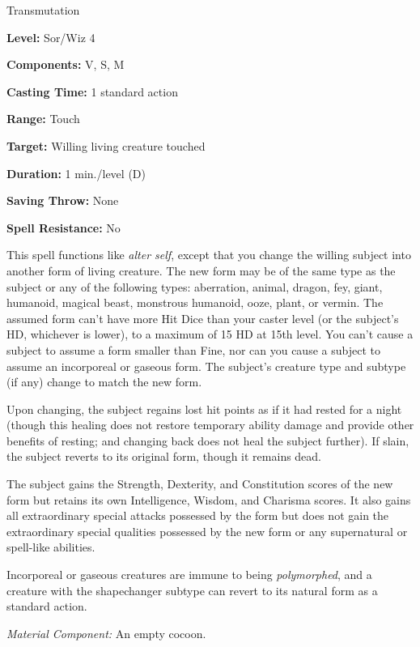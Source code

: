 
Transmutation

\textbf{Level:} Sor/Wiz 4

\textbf{Components:} V, S, M

\textbf{Casting Time:} 1 standard action

\textbf{Range:} Touch

\textbf{Target:} Willing living creature touched

\textbf{Duration:} 1 min./level (D)

\textbf{Saving Throw:} None

\textbf{Spell Resistance:} No

This spell functions like \textit{alter self}, except that you change the willing 
subject into another form of living creature. The new form may be of the same type 
as the subject or any of the following types: aberration, animal, dragon, fey, 
giant, humanoid, magical beast, monstrous humanoid, ooze, plant, or vermin. The 
assumed form can't have more Hit Dice than your caster level (or the subject's 
HD, whichever is lower), to a maximum of 15 HD at 15th level. You can't cause a 
subject to assume a form smaller than Fine, nor can you cause a subject to assume 
an incorporeal or gaseous form. The subject's creature type and subtype (if any) 
change to match the new form.

Upon changing, the subject regains lost hit points as if it had rested for a night 
(though this healing does not restore temporary ability damage and provide other 
benefits of resting; and changing back does not heal the subject further). If slain, 
the subject reverts to its original form, though it remains dead.

The subject gains the Strength, Dexterity, and Constitution scores of the new form 
but retains its own Intelligence, Wisdom, and Charisma scores. It also gains all 
extraordinary special attacks possessed by the form but does not gain the extraordinary 
special qualities possessed by the new form or any supernatural or spell-like abilities.

Incorporeal or gaseous creatures are immune to being \textit{polymorphed}, and 
a creature with the shapechanger subtype can revert to its natural form as a standard 
action.

\textit{Material Component:} An empty cocoon.

